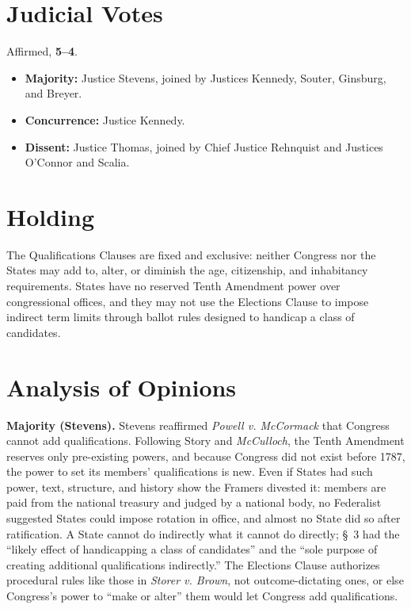 \documentclass[12pt]{article}
\begin{document}
\section{Judicial Votes}

Affirmed, \textbf{5--4}.
\begin{itemize}
\item \textbf{Majority:} Justice Stevens, joined by Justices Kennedy, Souter, Ginsburg, and Breyer.
\item \textbf{Concurrence:} Justice Kennedy.
\item \textbf{Dissent:} Justice Thomas, joined by Chief Justice Rehnquist and Justices O'Connor and Scalia.
\end{itemize}

\section{Holding}

The Qualifications Clauses are fixed and exclusive: neither Congress nor the States may add to, alter, or diminish the age, citizenship, and inhabitancy requirements. States have no reserved Tenth Amendment power over congressional offices, and they may not use the Elections Clause to impose indirect term limits through ballot rules designed to handicap a class of candidates.

\section{Analysis of Opinions}

\textbf{Majority (Stevens).} Stevens reaffirmed \textit{Powell v. McCormack} that Congress cannot add qualifications. Following Story and \textit{McCulloch}, the Tenth Amendment reserves only pre-existing powers, and because Congress did not exist before 1787, the power to set its members' qualifications is new. Even if States had such power, text, structure, and history show the Framers divested it: members are paid from the national treasury and judged by a national body, no Federalist suggested States could impose rotation in office, and almost no State did so after ratification. A State cannot do indirectly what it cannot do directly; \S~3 had the ``likely effect of handicapping a class of candidates'' and the ``sole purpose of creating additional qualifications indirectly.'' The Elections Clause authorizes procedural rules like those in \textit{Storer v. Brown}, not outcome-dictating ones, or else Congress's power to ``make or alter'' them would let Congress add qualifications.
\end{document}
